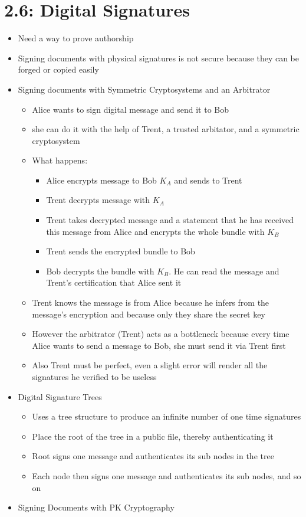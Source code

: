 \documentclass[]{article}
\begin{document}
\section{2.6: Digital Signatures}
\begin{itemize}
    \item Need a way to prove authorship
    \item Signing documents with physical signatures is not secure because they can be forged or copied easily
    \item Signing documents with Symmetric Cryptosystems and an Arbitrator
    \begin{itemize}
        \item Alice wants to sign digital message and send it to Bob
        \item she can do it with the help of Trent, a trusted arbitator, and a symmetric cryptosystem
        \item What happens:
        \begin{itemize}
            \item Alice encrypts message to Bob $K_{A}$ and sends to Trent
            \item Trent decrypts message with $K_{A}$
            \item Trent takes decrypted message and a statement that he has received this message from Alice and encrypts the whole bundle with $K_{B}$
            \item Trent sends the encrypted bundle to Bob
            \item Bob decrypts the bundle with $K_{B}$. He can read the message and Trent's certification that Alice sent it
        \end{itemize}
        \item Trent knows the message is from Alice because he infers from the message's encryption and because only they share the secret key
        \item However the arbitrator (Trent) acts as a bottleneck because every time Alice wants to send a message to Bob, she must send it via Trent first
        \item Also Trent must be perfect, even a slight error will render all the signatures he verified to be useless
    \end{itemize}
    \item Digital Signature Trees
    \begin{itemize}
        \item Uses a tree structure to produce an infinite number of one time signatures
        \item Place the root of the tree in a public file, thereby authenticating it
        \item Root signs one message and authenticates its sub nodes in the tree
        \item Each node then signs one message and authenticates its sub nodes, and so on
    \end{itemize}
    \item Signing Documents with PK Cryptography
\end{itemize}
\end{document}
